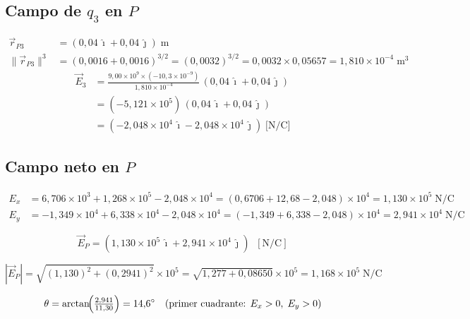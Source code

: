 \documentclass[12pt,letterpaper]{article}
\begin{document}
\subsection*{Campo de $q_3$ en $P$}

\begin{align*}
    \vec{r}_{P3} &= (0{,}04\,\hat{\imath}+0{,}04\,\hat{\jmath})\;\text{m}\\
    \|\vec{r}_{P3}\|^3 &= (0{,}0016+0{,}0016)^{3/2} = (0{,}0032)^{3/2}
                         = 0{,}0032\times0{,}05657 = 1{,}810\times10^{-4}\;\text{m}^3
\end{align*}
\begin{align*}
    \vec{E}_3
    &= \frac{9{,}00\times10^9\times(-10{,}3\times10^{-9})}{1{,}810\times10^{-4}}
       \,(0{,}04\,\hat{\imath}+0{,}04\,\hat{\jmath})\\
    &= (-5{,}121\times10^5)\,(0{,}04\,\hat{\imath}+0{,}04\,\hat{\jmath})\\
    &= (-2{,}048\times10^4\,\hat{\imath}-2{,}048\times10^4\,\hat{\jmath})\;\text{[N/C]}
\end{align*}

\subsection*{Campo neto en $P$}

\begin{align*}
    E_x &= 6{,}706\times10^3+1{,}268\times10^5-2{,}048\times10^4
         = (0{,}6706+12{,}68-2{,}048)\times10^4 = 1{,}130\times10^5\;\text{N/C}\\
    E_y &= -1{,}349\times10^4+6{,}338\times10^4-2{,}048\times10^4
         = (-1{,}349+6{,}338-2{,}048)\times10^4 = 2{,}941\times10^4\;\text{N/C}
\end{align*}

\begin{equation*}
    \boxed{\vec{E}_P = (1{,}130\times10^5\,\hat{\imath}+2{,}941\times10^4\,\hat{\jmath})\;\;[\text{N/C}]}
\end{equation*}

\begin{equation*}
    |\vec{E}_P|
    = \sqrt{(1{,}130)^2+(0{,}2941)^2}\times10^5
    = \sqrt{1{,}277+0{,}08650}\times10^5
    = 1{,}168\times10^5\;\text{N/C}
\end{equation*}

\begin{equation*}
    \theta = \arctan\!\Bigl(\tfrac{2{,}941}{11{,}30}\Bigr) = 14{,}6^\circ
    \quad\text{(primer cuadrante: }E_x>0,\;E_y>0\text{)}
\end{equation*}
\end{document}
